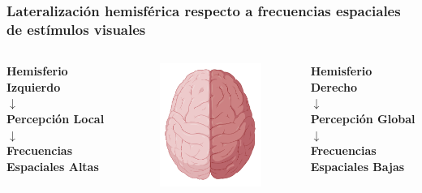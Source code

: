 \documentclass[
11pt, %
%
aspectratio=169, %
]{beamer}
\begin{document}
	\begin{frame}
		\frametitle{Lateralizaci\'on hemisf\'erica respecto a frecuencias espaciales de est\'imulos visuales}
		
		\begin{columns}[c] %
			\begin{column}{0.3\textwidth} %
				\centering
				\textbf{Hemisferio Izquierdo}\\
				$\downarrow$\\
				\textbf{Percepci\'on Local}\\
				$\downarrow$\\
				\textbf{Frecuencias Espaciales Altas}
				
				
			\end{column}
			
			\begin{column}{0.3\textwidth}
				\begin{figure}
					\centering
					\includegraphics[scale=0.7]{Graphics/brain}
				\end{figure}
			\end{column}
			
			\begin{column}{0.3\textwidth} %
			\centering
			\textbf{Hemisferio Derecho}\\
			
			$\downarrow$\\
			\textbf{Percepci\'on Global}\\
				$\downarrow$\\
				\textbf{Frecuencias Espaciales Bajas}
				
				
			\end{column}
		\end{columns}
		
	
		
		
	\end{frame}
\end{document}
